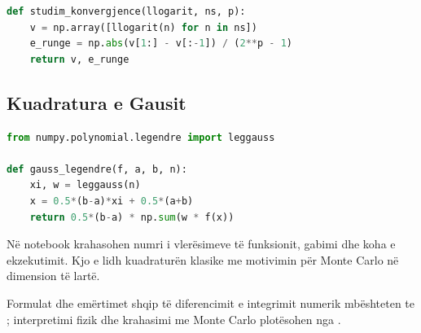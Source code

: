 \begin{lstlisting}[language=Python]
def studim_konvergjence(llogarit, ns, p):
    v = np.array([llogarit(n) for n in ns])
    e_runge = np.abs(v[1:] - v[:-1]) / (2**p - 1)
    return v, e_runge
\end{lstlisting}

\subsection{Kuadratura e Gausit}
\begin{lstlisting}[language=Python,caption={Gauss--Legendre në një interval të përgjithshëm.}]
from numpy.polynomial.legendre import leggauss

def gauss_legendre(f, a, b, n):
    xi, w = leggauss(n)
    x = 0.5*(b-a)*xi + 0.5*(a+b)
    return 0.5*(b-a) * np.sum(w * f(x))
\end{lstlisting}
Në notebook krahasohen numri i vlerësimeve të funksionit, gabimi dhe koha e ekzekutimit. Kjo e lidh kuadraturën klasike me motivimin për Monte Carlo në dimension të lartë.

Formulat dhe emërtimet shqip të diferencimit e integrimit numerik mbështeten te \cite{hanelli,hoxha,datja}; interpretimi fizik dhe krahasimi me Monte Carlo plotësohen nga \cite{newman,press}.
